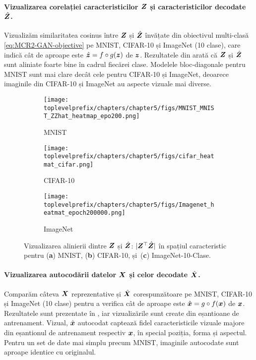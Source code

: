\documentclass[../../book-main_ro.tex]{subfiles}
\begin{document}
\paragraph{Vizualizarea corelației caracteristicilor $\bm{Z}$ și caracteristicilor decodate $\hat {\bm{Z}}$.} Vizualizăm similaritatea cosinus între $\bm{Z}$ și $\hat{\bm{Z}}$ învățate din obiectivul multi-clasă \eqref{eq:MCR2-GAN-objective} pe MNIST, CIFAR-10 și ImageNet (10 clase), care indică cât de aproape este $\hat{\bm{z}} = f\circ g(\bm{z})$ de $\bm{z}$. Rezultatele din  arată că $\bm{Z}$ și $\hat{\bm{Z}}$ sunt aliniate foarte bine în cadrul fiecărei clase. Modelele bloc-diagonale pentru MNIST sunt mai clare decât cele pentru CIFAR-10 și ImageNet, deoarece imaginile din CIFAR-10 și ImageNet au aspecte vizuale mai diverse.

\begin{figure}[t]
    \begin{subfigure}[t]{0.3\textwidth}
        \centering
        \texttt{[image: \\toplevelprefix/chapters/chapter5/figs/MNIST\_MNIST\_ZZhat\_heatmap\_epo200.png]}
        \caption{MNIST}
    \end{subfigure}
    \hfill
    \begin{subfigure}[t]{0.3\textwidth}
        \centering
        \texttt{[image: \\toplevelprefix/chapters/chapter5/figs/cifar\_heatmat\_cifar.png]}
        \caption{CIFAR-10}
    \end{subfigure}
    \hfill
    \begin{subfigure}[t]{0.3\textwidth}
        \centering
        \texttt{[image: \\toplevelprefix/chapters/chapter5/figs/Imagenet\_heatmat\_epoch200000.png]}
        \caption{ImageNet}
    \end{subfigure}
    \caption{{Vizualizarea} %
    alinierii dintre $\bm{Z}$ și $\hat{\bm{Z}}$: $|\bm{Z}^\top \hat{\bm{Z}}|$ în spațiul caracteristic pentru (\textbf{a}) MNIST, (\textbf{b}) CIFAR-10, și~(\textbf{c}) ImageNet-10-Clase.}
    \label{fig:justifyz=z}
\end{figure}




\paragraph{Vizualizarea autocodării datelor $\bm{X}$ și celor decodate $\hat {\bm{X}}$.} Comparăm câteva $\bm{X}$ reprezentative și $\hat{\bm{X}}$ corespunzătoare pe MNIST, CIFAR-10 și ImageNet (10 clase) pentru a verifica cât de aproape este $\hat {\bm{x}} = g\circ f(\bm{x})$ de $\bm{x}$. Rezultatele sunt prezentate în , iar vizualizările sunt create din eșantioane de antrenament. Vizual, $\hat {\bm{x}}$ autocodat captează fidel caracteristicile vizuale majore din eșantionul de antrenament respectiv $\bm{x}$, în special poziția, forma și aspectul. Pentru un set de date mai simplu precum MNIST, imaginile autocodate sunt aproape identice cu originalul.
\end{document}
